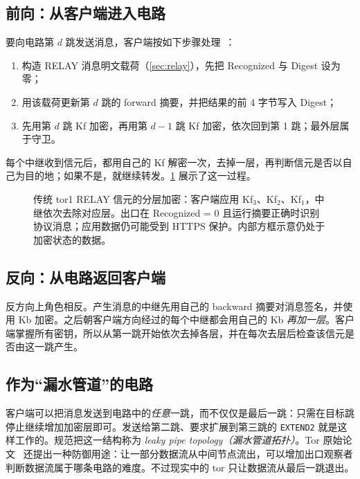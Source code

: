 \subsection{前向：从客户端进入电路}

要向电路第 $d$ 跳发送消息，客户端按如下步骤处理~：
\begin{enumerate}
  \item 构造 RELAY 消息明文载荷（\cref{sec:relay}），先把 Recognized 与 Digest 设为零；
  \item 用该载荷更新第 $d$ 跳的 forward 摘要，并把结果的前 4 字节写入 Digest；
  \item 先用第 $d$ 跳 Kf 加密，再用第 $d-1$ 跳 Kf 加密，依次回到第 1 跳；最外层属于守卫。
\end{enumerate}

每个中继收到信元后，都用自己的 Kf 解密一次，去掉一层，再判断信元是否以自己为目的地；如果不是，就继续转发。\cref{fig:cipolla} 展示了这一过程。

\begin{figure}[htbp]
\centering

\caption{传统 tor1 RELAY 信元的分层加密：客户端应用 Kf$_3$、Kf$_2$、Kf$_1$，中继依次去除对应层。出口在 Recognized = 0 且运行摘要正确时识别协议消息；应用数据仍可能受到 HTTPS 保护。内部方框示意仍处于加密状态的数据。}
\label{fig:cipolla}
\end{figure}

\subsection{反向：从电路返回客户端}

反方向上角色相反。产生消息的中继先用自己的 backward 摘要对消息签名，并使用 Kb 加密。之后朝客户端方向经过的每个中继都会用自己的 Kb \emph{再加一层}。客户端掌握所有密钥，所以从第一跳开始依次去掉各层，并在每次去层后检查该信元是否由这一跳产生。

\subsection{作为“漏水管道”的电路}

客户端可以把消息发送到电路中的\emph{任意}一跳，而不仅仅是最后一跳：只需在目标跳停止继续增加加密层即可。发送给第二跳、要求扩展到第三跳的 \texttt{EXTEND2} 就是这样工作的。规范把这一结构称为 \emph{leaky pipe topology（漏水管道拓扑）}。Tor 原始论文~\cite{dingledine2004tor} 还提出一种防御用途：让一部分数据流从中间节点流出，可以增加出口观察者判断数据流属于哪条电路的难度。不过现实中的 tor 只让数据流从最后一跳退出。

